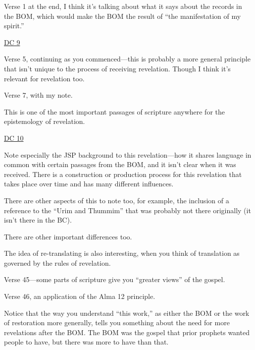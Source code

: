 \begin{compactdesc}
\begin{compactitem}
					\item Verse 1 at the end, I think it's talking about what it says about the records in the BOM, which would make the BOM the result of ``the manifestation of my spirit.''
				\end{compactitem}
			\item \hyperref[DC9]{DC 9}
				\begin{compactitem}
					\item Verse 5, continuing as you commenced---this is probably a more general principle that isn't unique to the process of receiving revelation. Though I think it's relevant for revelation too.
					\item Verse 7, with my note.
					\item This is one of the most important passages of scripture anywhere for the epistemology of revelation.
				\end{compactitem}
			\item \hyperref[DC10]{DC 10}
				\begin{compactitem}
					\item Note especially the JSP background to this revelation---how it shares language in common with certain passages from the BOM, and it isn't clear when it was received. There is a construction or production process for this revelation that takes place over time and has many different influences.
						\begin{compactitem}
							\item There are other aspects of this to note too, for example, the inclusion of a reference to the ``Urim and Thummim'' that was probably not there originally (it isn't there in the BC).
							\item There are other important differences too.
						\end{compactitem}
					\item The idea of re-translating is also interesting, when you think of translation as governed by the rules of revelation.
					\item Verse 45---some parts of scripture give you ``greater views'' of the gospel.
					\item Verse 46, an application of the Alma 12 principle.
						\begin{compactitem}
							\item Notice that the way you understand ``this work,'' as either the BOM or the work of restoration more generally, tells you something about the need for more revelations after the BOM. The BOM was the gospel that prior prophets wanted people to have, but there was more to have than that.

\end{compactitem}
\end{compactitem}
\end{compactdesc}
